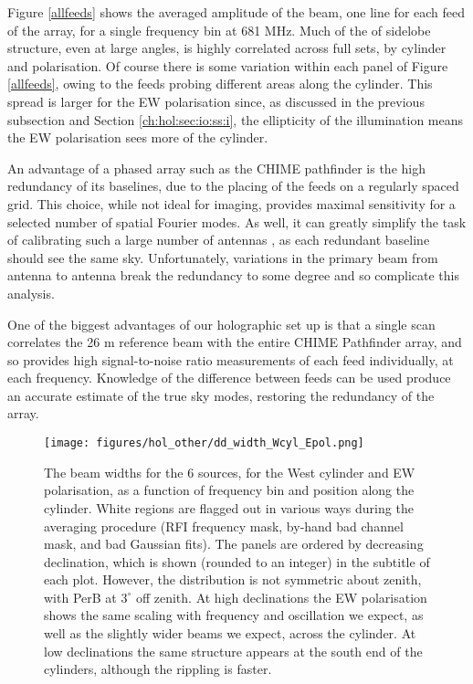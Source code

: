 Figure \ref{allfeeds} shows the averaged amplitude of the beam, one line for each feed of the array, for a single frequency bin at 681 MHz. Much of the of sidelobe structure, even at large angles, is highly correlated across full sets, by cylinder and polarisation. Of course there is some variation within each panel of Figure \ref{allfeeds}, owing to the feeds probing different areas along the cylinder. This spread is larger for the EW polarisation since, as discussed in the previous subsection and Section \ref{ch:hol:sec:io:ss:i}, the ellipticity of the illumination means the EW polarisation sees more of the cylinder.

An advantage of a phased array such as the CHIME pathfinder is the high redundancy of its baselines, due to the placing of the feeds on a regularly spaced grid. This choice, while not ideal for imaging, provides maximal sensitivity for a selected number of spatial Fourier modes. As well, it can greatly simplify the task of calibrating such a large number of antennas \citep{redundantbaselines}, as each redundant baseline should see the same sky. Unfortunately, variations in the primary beam from antenna to antenna break the redundancy to some degree and so complicate this analysis.

One of the biggest advantages of our holographic set up is that a single scan correlates the 26 m reference beam with the entire CHIME Pathfinder array, and so provides high signal-to-noise ratio measurements of each feed individually, at each frequency. Knowledge of the difference between feeds can be used produce an accurate estimate of the true sky modes, restoring the redundancy of the array.

\begin{figure}[h!]
\begin{center}
\texttt{[image: figures/hol\_other/dd\_width\_Wcyl\_Epol.png]}
\caption{The beam widths for the 6 sources, for the West cylinder and EW polarisation, as a function of frequency bin and position along the cylinder. White regions are flagged out in various ways during the averaging procedure (RFI frequency mask, by-hand bad channel mask, and bad Gaussian fits). The panels are ordered by decreasing declination, which is shown (rounded to an integer) in the subtitle of each plot. However, the distribution is not symmetric about zenith, with PerB at $3^{\circ}$ off zenith. \newline At high declinations the EW polarisation shows the same scaling with frequency and oscillation we expect, as well as the slightly wider beams we expect, across the cylinder. At low declinations the same structure appears at the south end of the cylinders, although the rippling is faster.}
\label{widthWE}
\end{center}
\end{figure}

